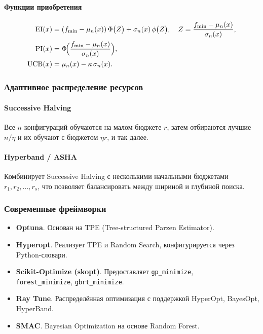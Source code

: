 \paragraph{Функции приобретения}  
\begin{align}
\mathrm{EI}(x)
&= (f_{\min}-\mu_n(x))\,\Phi\bigl(Z\bigr)
+ \sigma_n(x)\,\phi\bigl(Z\bigr),
\quad Z = \frac{f_{\min}-\mu_n(x)}{\sigma_n(x)},
\label{eq:expected-improvement}\\
\mathrm{PI}(x)
&= \Phi\!\Bigl(\frac{f_{\min}-\mu_n(x)}{\sigma_n(x)}\Bigr),
\label{eq:probability-improvement}\\
\mathrm{UCB}(x)
&= \mu_n(x) - \kappa\,\sigma_n(x).
\label{eq:upper-conf-bound}
\end{align}

\subsubsection{Адаптивное распределение ресурсов}

\paragraph{Successive Halving}  
Все \(n\) конфигураций обучаются на малом бюджете \(r\), затем отбираются лучшие \(n/\eta\) и их обучают с бюджетом \(\eta r\), и так далее.

\paragraph{Hyperband / ASHA}  
Комбинирует Successive Halving с несколькими начальными бюджетами \(r_1, r_2, \dots, r_s\), что позволяет балансировать между шириной и глубиной поиска.

\subsubsection{Современные фреймворки}

\begin{itemize}
  \item \textbf{Optuna}. Основан на TPE (Tree-structured Parzen Estimator).
  \item \textbf{Hyperopt}. Реализует TPE и Random Search, конфигурируется через Python-словари.
  \item \textbf{Scikit-Optimize (skopt)}. Предоставляет \texttt{gp\_minimize},  \\
    \texttt{forest\_minimize}, \texttt{gbrt\_minimize}.
  \item \textbf{Ray Tune}. Распределённая оптимизация с поддержкой HyperOpt, BayesOpt, HyperBand.
  \item \textbf{SMAC}. Bayesian Optimization на основе Random Forest.
\end{itemize}


